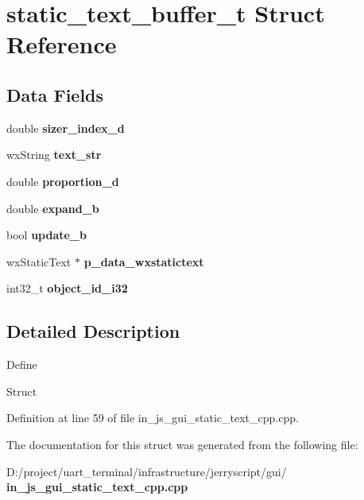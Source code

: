 \section{static\+\_\+text\+\_\+buffer\+\_\+t Struct Reference}
\label{structstatic__text__buffer__t}
\subsection*{Data Fields}
\begin{DoxyCompactItemize}
\item 
\mbox{\label{structstatic__text__buffer__t_aae99f717aadbf88f890c71a293468af8}} 
double {\bfseries sizer\+\_\+index\+\_\+d}
\item 
\mbox{\label{structstatic__text__buffer__t_ae027b01a16a8b9ded760f0ead4d7a951}} 
wx\+String {\bfseries text\+\_\+str}
\item 
\mbox{\label{structstatic__text__buffer__t_a93e3ac3895fbb25863fb66af78e0ed39}} 
double {\bfseries proportion\+\_\+d}
\item 
\mbox{\label{structstatic__text__buffer__t_a40506be5f1249944fed816e11465f5ca}} 
double {\bfseries expand\+\_\+b}
\item 
\mbox{\label{structstatic__text__buffer__t_a4aed9ad79f44786d35de6f7804904494}} 
bool {\bfseries update\+\_\+b}
\item 
\mbox{\label{structstatic__text__buffer__t_aae497bb46e2813656d1ad5a00a02deaf}} 
wx\+Static\+Text $\ast$ {\bfseries p\+\_\+data\+\_\+wxstatictext}
\item 
\mbox{\label{structstatic__text__buffer__t_aa7683407966206b7eb17d410ee75d880}} 
int32\+\_\+t {\bfseries object\+\_\+id\+\_\+i32}
\end{DoxyCompactItemize}


\subsection{Detailed Description}
Define

Struct 

Definition at line 59 of file in\+\_\+js\+\_\+gui\+\_\+static\+\_\+text\+\_\+cpp.\+cpp.



The documentation for this struct was generated from the following file\+:\begin{DoxyCompactItemize}
\item 
D\+:/project/uart\+\_\+terminal/infrastructure/jerryscript/gui/\textbf{ in\+\_\+js\+\_\+gui\+\_\+static\+\_\+text\+\_\+cpp.\+cpp}\end{DoxyCompactItemize}
